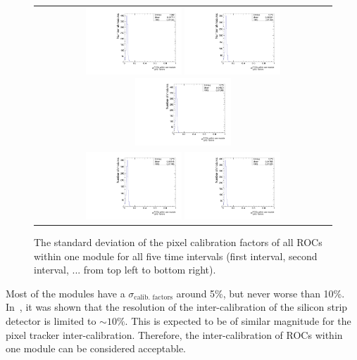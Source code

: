 \begin{figure}[!b]
  \centering 
  \begin{tabular}{c}
    \includegraphics[width=0.33\textwidth]{figures/analysis_2/PixelCalibration/rmsOfROCs_N_0_AB_CL0} 
    \includegraphics[width=0.33\textwidth]{figures/analysis_2/PixelCalibration/rmsOfROCs_N_0_C1_CL0} 
    \includegraphics[width=0.33\textwidth]{figures/analysis_2/PixelCalibration/rmsOfROCs_N_0_C2_CL0} \\
    \includegraphics[width=0.33\textwidth]{figures/analysis_2/PixelCalibration/rmsOfROCs_N_0_D1_CL0} 
    \includegraphics[width=0.33\textwidth]{figures/analysis_2/PixelCalibration/rmsOfROCs_N_0_D2_CL0} 
  \end{tabular}
  \caption{The standard deviation of the pixel calibration factors of all ROCs within one module for all five time intervals (first interval, second interval, ... from top left to bottom right).}
  \label{fig:SigmaPixelCalibrationROCs}
\end{figure} 
Most of the modules have a $\sigma_{\text{calib. factors}}$ around 5\%, but never worse than 10\%.
In~\cite{bib:Quertenmont_2010}, it was shown that the resolution of the inter-calibration of the silicon strip detector is limited to $\sim 10\%$.
This is expected to be of similar magnitude for the pixel tracker inter-calibration.
Therefore, the inter-calibration of ROCs within one module can be considered acceptable.

